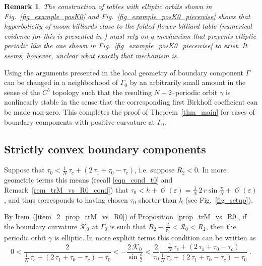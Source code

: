 \documentclass{amsart}
\theoremstyle{plain} %
\newtheorem{remark}[theorem]{Remark}
\begin{document}
\begin{remark}
  The construction of tables with elliptic orbits shown in
  Fig.~\ref{fig_example_posK0} and
  Fig.~\ref{fig_example_posK0_piecewise} shows that
  hyperbolicity of moon billiards close to the folded flower billiard table
  (numerical evidence for this is presented in \cite{MR3456006})
  must rely on a mechanism that prevents elliptic periodic like
  the one shown in Fig.~\ref{fig_example_posK0_piecewise} to exist.
  It seems, however, unclear what exactly that mechanism is.
\end{remark}

Using the arguments presented in
\cites{MR2563800,bunimovich2018smoothconvexchaoticbilliard}
the local geometry of boundary component $\Gamma$
can be changed in a neighborhood of $\Gamma_0$
by an arbitrarily small amount in the sense of the $C^5$ topology
such that the resulting $N+2$--periodic orbit $\gamma$ is
nonlinearly stable in the sense that the corresponding
first Birkhoff coefficient can be made non-zero.
This completes the proof of Theorem~\ref{thm_main} for cases of
boundary components with positive curvature at $\Gamma_0$.






\subsection{Strictly convex boundary components}
\label{sect_examples_convex}

Suppose that
$
\tau_0
<
\frac{1}{N}\,\tau_c
+
(2\,\tau_1 + \tau_0 - \tau_c)
$, i.e. suppose $R_2 < 0$.
In more geometric terms this means (recall \eqref{eqn_cond_t0}
and Remark~\ref{rem_trM_vs_R0_cond})
that
$
\tau_0 < h + \operatorname{\mathcal{O}}(\varepsilon)
=
\frac{1}{N}\,2\,r \sin\frac{\pi}{N} + \operatorname{\mathcal{O}}(\varepsilon)
$, and thus corresponds to having chosen $\tau_0$ shorter
than $h$ (see Fig.~\ref{fig_setup}).

By Item~(\ref{item_2_prop_trM_vs_R0}) of Proposition~\ref{prop_trM_vs_R0},
if the boundary curvature ${\mathcal K}_0$
at $\Gamma_0$ is such that
$R_2 - \frac{2}{\tau_0} < {\mathcal R}_0 < R_2$, then
the periodic orbit $\gamma$ is elliptic.
In more explicit terms this condition can be written as
\begin{equation*}
  0
  <
  \frac{2
  }{
  \frac{1}{N}\,\tau_c
  +
  (2\,\tau_1 + \tau_0 - \tau_c)
  -
  \tau_0
  }
  <
  - \frac{2\,{\mathcal K}_0}{\sin\frac{\varepsilon}{2} }
  <
  \frac{2}{\tau_0}
  \frac{
  \frac{1}{N}\,\tau_c
  +
  (2\,\tau_1 + \tau_0 - \tau_c)
  }{
  \frac{1}{N}\,\tau_c
  +
  (2\,\tau_1 + \tau_0 - \tau_c)
  -
  \tau_0
  }
  \;.
\end{equation*}
\end{document}
